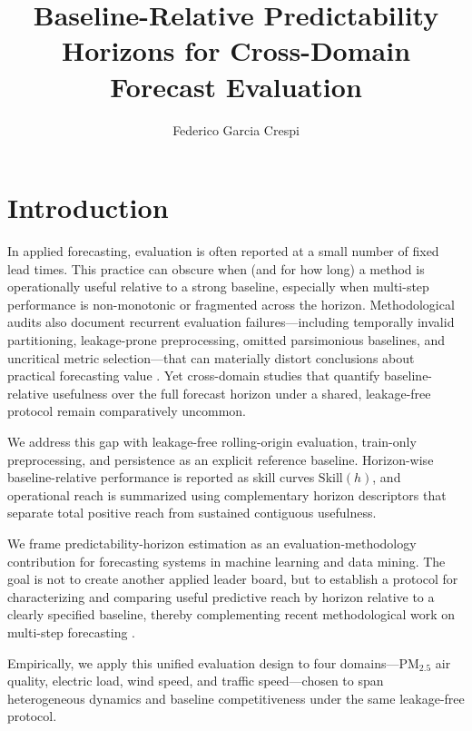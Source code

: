 \documentclass[pdflatex]{sn-jnl}
\title[Baseline-relative predictability horizons]{Baseline-Relative Predictability Horizons for Cross-Domain Forecast Evaluation}
\author*[1]{Federico Garcia Crespi}
\affil[1]{Departamento de Ingenier\'ia de Computadores, Universidad Miguel Hern\'andez, Elche, Spain}
\begin{document}
\maketitle




\section{Introduction}

In applied forecasting, evaluation is often reported at a small number of fixed lead times. This practice can obscure when (and for how long) a method is operationally useful relative to a strong baseline, especially when multi-step performance is non-monotonic or fragmented across the horizon. Methodological audits also document recurrent evaluation failures—including temporally invalid partitioning, leakage-prone preprocessing, omitted parsimonious baselines, and uncritical metric selection—that can materially distort conclusions about practical forecasting value \citep{hewamalage2023dmkd}. Yet cross-domain studies that quantify baseline-relative usefulness over the full forecast horizon under a shared, leakage-free protocol remain comparatively uncommon.

We address this gap with leakage-free rolling-origin evaluation, train-only preprocessing, and persistence as an explicit reference baseline. Horizon-wise baseline-relative performance is reported as skill curves $\mathrm{Skill}(h)$, and operational reach is summarized using complementary horizon descriptors that separate total positive reach from sustained contiguous usefulness.

We frame predictability-horizon estimation as an evaluation-methodology contribution for forecasting systems in machine learning and data mining. The goal is not to create another applied leader board, but to establish a protocol for characterizing and comparing useful predictive reach by horizon relative to a clearly specified baseline, thereby complementing recent methodological work on multi-step forecasting \citep{green2025stratify,kreuzer2025trend}.

Empirically, we apply this unified evaluation design to four domains—PM$_{2.5}$ air quality, electric load, wind speed, and traffic speed—chosen to span heterogeneous dynamics and baseline competitiveness under the same leakage-free protocol.
\end{document}
